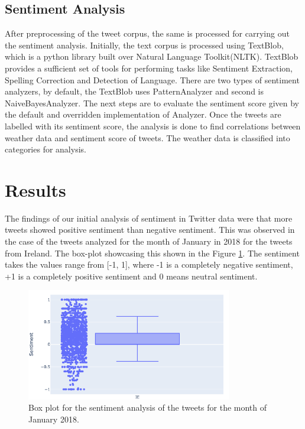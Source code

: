 \documentclass[a4paper,10pt]{article}
\begin{document}
	\subsection{Sentiment Analysis}
	
	After preprocessing of the tweet corpus, the same is processed for carrying out the sentiment analysis. Initially, the text corpus is processed using TextBlob, which is a python library built over Natural Language Toolkit(NLTK). TextBlob provides a sufficient set of tools for performing tasks like Sentiment Extraction, Spelling Correction and Detection of Language. There are two types of sentiment analyzers, by default, the TextBlob uses PatternAnalyzer and second is NaiveBayesAnalyzer. The next steps are to evaluate the sentiment score given by the default and overridden implementation of Analyzer. Once the tweets are labelled with its sentiment score, the analysis is done to find correlations between weather data and sentiment score of tweets. The weather data is classified into categories for analysis. 


    \section{Results}
    \label{results}
    
    The findings of our initial analysis of sentiment in Twitter data were that more tweets showed positive sentiment than negative sentiment. This was observed in the case of the tweets analyzed for the month of January in 2018 for the tweets from Ireland. The box-plot showcasing this shown in the Figure \ref{fig:box_plot_jan_2018}. The sentiment takes the values range from [-1, 1], where -1 is a completely negative sentiment, +1 is a completely positive sentiment and 0 means neutral sentiment.
    
    \begin{figure}
    	\includegraphics[width=0.8\textwidth]{boxplot_Jan2018.png}
    	\caption{Box plot for the sentiment analysis of the tweets for the month of January 2018.}
    	\label{fig:box_plot_jan_2018}
    \end{figure}
\end{document}
